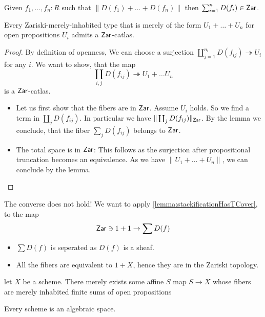 \begin{lemma}
	Given $f_1, \hdots,f_n : R$ such that $\| D(f_1) + \hdots + D(f_n) \|$ then $\sum_{i=1}^n D(f_i) \in \mathsf{Zar}$.
\end{lemma}
\begin{prop}
	Every Zariski-merely-inhabited type that is merely of the form $U_1 + \hdots + U_n$ for open propositions $U_i$ admits a $\mathsf{Zar}$-catlas.
\end{prop}
\begin{proof}
	By definition of openness, We can choose a surjection $\coprod_{j=1}^{n_i} D(f_{ij}) \twoheadrightarrow U_i$ for any $i$. We want to show, that the map
	\[
	\coprod_{i , j} D(f_{ij}) \twoheadrightarrow U_1 + \hdots U_n
	\]
	is a $\mathsf{Zar}$-catlas. 
	\begin{itemize}
		\item Let us first show that the fibers are in $\mathsf{Zar}$. Assume $U_i$ holds. So we find a term in $\coprod_j D(f_{ij})$. In particular we have $\| \coprod_j D(f_{ij})\|_{\mathsf{Zar}}$. By the lemma we conclude, that the fiber $\sum_j D(f_{ij})$ belongs to $\mathsf{Zar}$.\\
		\item The total space is in $\mathsf{Zar}$: This follows as the surjection after propositional truncation becomes an equivalence. As we have $\| U_1 + \hdots + U_n\|$, we can conclude by the lemma.
	\end{itemize}
	
\end{proof}
\begin{warning}
	The converse does not hold! We want to apply \ref{lemma:stackificationHasTCover}, to the map
	\[\mathsf{Zar} \ni 1 + 1 \to \sum D(f) \]
	\begin{itemize}
		\item 	$\sum D(f)$ is seperated as $D(f)$ is a sheaf.
		\item 	All the fibers are equivalent to $1 + X$, hence they are in the Zariski topology.
	\end{itemize}	
\end{warning}
\begin{lemma}
	let $X$ be a scheme. There merely exists some affine $S$  map $S \to X$ whose fibers are merely inhabited finite sums of open propositions 
\end{lemma}

\begin{corollary}		
		Every scheme is an algebraic space.
\end{corollary}


